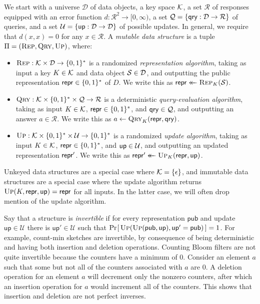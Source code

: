 We start with a universe $\mathcal{D}$ of data objects, a key space $\mathcal{K}$, a set $\mathcal{R}$ of responses equipped with an error function $d: \mathcal{R}^2 \to [0,\infty)$, a set $\mathcal{Q} = \{\mathsf{qry}: \mathcal{D} \to \mathcal{R}\}$ of queries, and a set $\mathcal{U} = \{\mathsf{up}: \mathcal{D} \to \mathcal{D}\}$ of possible updates. In general, we require that $d(x,x) = 0$ for any $x \in \mathcal{R}$. A {\em mutable data structure} is a tuple $\Pi = (\textsc{Rep},\textsc{Qry},\textsc{Up})$, where: 

\begin{itemize}
  \item $\textsc{Rep}: \mathcal{K} \times \mathcal{D} \to \{0,1\}^*$ is a randomized {\em representation algorithm}, taking as input a key $K \in \mathcal{K}$ and data object $\mathcal{S} \in \mathcal{D}$, and outputting the public representation $\mathsf{repr} \in \{0,1\}^*$ of $D$. We write this as $\mathsf{repr} \mathrel{\leftarrow\mkern-14mu\leftarrow} \textsc{Rep}_K(\mathcal{S})$.
  \item $\textsc{Qry}: \mathcal{K} \times \{0,1\}^* \times \mathcal{Q} \to \mathcal{R}$ is a deterministic {\em query-evaluation algorithm}, taking as input $K \in \mathcal{K}$, $\mathsf{repr} \in \{0,1\}^*$, and $\mathsf{qry} \in \mathcal{Q}$, and outputting an answer $a \in \mathcal{R}$. We write this as $a \gets \textsc{Qry}_K(\mathsf{repr},\mathsf{qry})$.
  \item $\textsc{Up}: \mathcal{K} \times \{0,1\}^* \times \mathcal{U} \to \{0,1\}^*$ is a randomized {\em update algorithm}, taking as input $K \in \mathcal{K}$, $\mathsf{repr} \in \{0,1\}^*$, and $\mathsf{up} \in \mathcal{U}$, and outputting an updated representation $\mathsf{repr}'$. We write this as $\mathsf{repr}' \mathrel{\leftarrow\mkern-14mu\leftarrow} \textsc{Up}_K(\mathsf{repr},\mathsf{up})$.
\end{itemize}

Unkeyed data structures are a special case where $\mathcal{K} = \{\epsilon\}$, and immutable data structures are a special case where the update algorithm returns $\textsc{Up}(K,\mathsf{repr},\mathsf{up})=\mathsf{repr}$ for all inputs.  In the latter case, we will often drop mention of the update algorithm.


Say that a structure is {\em invertible} if for every representation $\mathsf{pub}$ and update $\mathsf{up} \in \mathcal{U}$ there is $\mathsf{up}' \in \mathcal{U}$ such that $\Pr\hspace{-1pt}\left[\,\textsc{Up}(\textsc{Up}(\mathsf{pub},\mathsf{up}),\mathsf{up}' = \mathsf{pub})\,\right] = 1$.  For example, count-min sketches are invertible, by consequence of being deterministic and having both insertion and deletion operations. Counting Bloom filters are not quite invertible because the counters have a minimum of 0. Consider an element $a$ such that some but not all of the counters associated with $a$ are 0. A deletion operation for an element $a$ will decrement only the nonzero counters, after which an insertion operation for $a$ would increment all of the counters. This shows that insertion and deletion are not perfect inverses.


